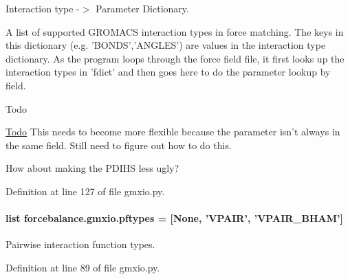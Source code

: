 Interaction type -\/$>$ Parameter Dictionary. 

A list of supported G\-R\-O\-M\-A\-C\-S interaction types in force matching. The keys in this dictionary (e.\-g. 'B\-O\-N\-D\-S','A\-N\-G\-L\-E\-S') are values in the interaction type dictionary. As the program loops through the force field file, it first looks up the interaction types in 'fdict' and then goes here to do the parameter lookup by field. \begin{DoxyRefDesc}{Todo}
\item[\hyperlink{todo__todo000010}{Todo}]This needs to become more flexible because the parameter isn't always in the same field. Still need to figure out how to do this. 

How about making the P\-D\-I\-H\-S less ugly? \end{DoxyRefDesc}


Definition at line 127 of file gmxio.\-py.

\hypertarget{namespaceforcebalance_1_1gmxio_a59695b79df36efbe64ac88fd64bfb366}{
\paragraph[{pftypes}]{\setlength{\rightskip}{0pt plus 5cm}list forcebalance.\-gmxio.\-pftypes = \mbox{[}None, 'V\-P\-A\-I\-R', 'V\-P\-A\-I\-R\-\_\-\-B\-H\-A\-M'\mbox{]}}}\label{namespaceforcebalance_1_1gmxio_a59695b79df36efbe64ac88fd64bfb366}


Pairwise interaction function types. 



Definition at line 89 of file gmxio.\-py.

